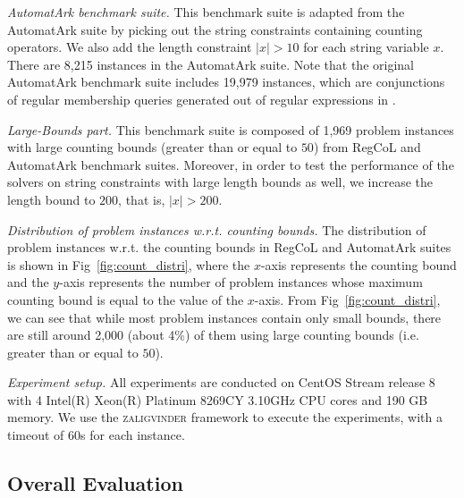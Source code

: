 \medskip
\noindent
\emph{AutomatArk benchmark suite.}
This benchmark suite is adapted from the AutomatArk suite \cite{z3str3re} by picking out the string constraints containing counting operators. We also add the length constraint $|x| > 10$ for each string variable $x$. There are 8,215 instances in the AutomatArk suite.
Note that the original AutomatArk benchmark suite \cite{z3str3re} includes 19,979 instances, which are conjunctions of regular membership queries generated out of regular expressions in \cite{automatark}.

\medskip
\noindent

\emph{Large-Bounds part.} This benchmark suite is composed of 1,969 problem instances with large counting bounds (greater than or equal to $50$) from RegCoL and AutomatArk benchmark suites.  
Moreover, in order to test the performance of the solvers on string constraints with large length bounds as well, we increase the length bound to $200$, that is, $|x| > 200$.


\medskip
\noindent
\emph{Distribution of problem instances w.r.t. counting bounds. }
The distribution of problem instances w.r.t. the counting bounds in RegCoL and AutomatArk suites is shown in Fig~\ref{fig:count_distri}, where the $x$-axis represents the counting bound and the $y$-axis represents the number of problem instances whose maximum counting bound is equal to the value of the $x$-axis. 
From Fig~\ref{fig:count_distri}, we can see that while most problem instances contain only small bounds, there are still around 2,000  (about 4\%) of them using large counting bounds (i.e. greater than or equal to $50$).

\medskip
\noindent
\emph{Experiment setup.}
All experiments are conducted on CentOS Stream release 8 with 4 Intel(R) Xeon(R) Platinum 8269CY 3.10GHz CPU cores and 190 GB memory. We use the \textsc{zaligvinder} framework \cite{zaligvinder_2021} to execute the experiments, with a timeout of 60s for each instance.


\subsection{Overall Evaluation}\label{subsec:overall_eval}

